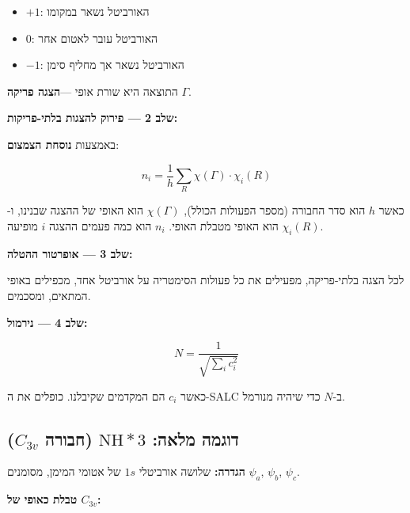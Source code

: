 \documentclass[
  hebrew,
  letterpaper,
  DIV=11,
  numbers=noendperiod]{scrreprt}
\providecommand{\tightlist}{%
  \setlength{\itemsep}{0pt}\setlength{\parskip}{0pt}}
\begin{document}
\begin{itemize}
\tightlist
\item
  \(+1\): האורביטל נשאר במקומו
\item
  \(0\): האורביטל עובר לאטום אחר
\item
  \(-1\): האורביטל נשאר אך מחליף סימן
\end{itemize}

התוצאה היא שורת אופי ---\textbf{הצגה פריקה} \(\Gamma\).

\textbf{שלב 2 --- פירוק להצגות בלתי-פריקות:}

באמצעות \textbf{נוסחת הצמצום}:

\[n_i = \frac{1}{h} \sum_R \chi(\Gamma) \cdot \chi_i(R)\]

כאשר \(h\) הוא סדר החבורה (מספר הפעולות הכולל), \(\chi(\Gamma)\) הוא
האופי של ההצגה שבנינו, ו-\(\chi_i(R)\) הוא האופי מטבלת האופי. \(n_i\)
הוא כמה פעמים ההצגה \(i\) מופיעה.

\textbf{שלב 3 --- אופרטור ההטלה:}

לכל הצגה בלתי-פריקה, מפעילים את כל פעולות הסימטריה על אורביטל אחד,
מכפילים באופי המתאים, ומסכמים.

\textbf{שלב 4 --- נירמול:}

\[N = \frac{1}{\sqrt{\sum_i c_i^2}}\]

כאשר \(c_i\) הם המקדמים שקיבלנו. כופלים את ה-SALC ב-\(N\) כדי שיהיה
מנורמל.

\subsection{\texorpdfstring{דוגמה מלאה: \(\text{NH}*3\) (חבורה
\(C_{3v}\))}{דוגמה מלאה: \textbackslash text\{NH\}*3 (חבורה C\_\{3v\})}}\label{ux5d3ux5d5ux5d2ux5deux5d4-ux5deux5dcux5d0ux5d4-textnh3-ux5d7ux5d1ux5d5ux5e8ux5d4-c_3v}

\textbf{הגדרה:} שלושה אורביטלי \(1s\) של אטומי המימן, מסומנים
\(\psi_a\), \(\psi_b\), \(\psi_c\).

\textbf{טבלת כאופי של \(C_{3v}\):}
\end{document}
